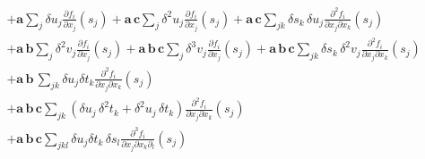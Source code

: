 \documentclass[11pt]{article}
\begin{document}
\begin{align*}
\\
&+ 
\mathbf{a} \sum_{j} \delta u_{j} \frac{ \partial f_{i} }{ \partial x_{j} } \! \left( s_{j} \right)
+ \mathbf{a} \, \mathbf{c} \sum_{j} \delta^{2} u_{j} 
\frac{ \partial f_{i} }{ \partial x_{j} } \! \left( s_{j} \right) 
+ \mathbf{a} \, \mathbf{c} \sum_{jk} \delta s_{k} \, \delta u_{j} 
\frac{ \partial^{2} f_{i} }{ \partial x_{j} \partial x_{k} } \! \left( s_{j} \right)
\\
&+ 
\mathbf{a} \, \mathbf{b} \sum_{j} \delta^{2} v_{j} 
\frac{ \partial f_{i} }{ \partial x_{j} } \! \left( s_{j} \right)
+ \mathbf{a} \, \mathbf{b} \, \mathbf{c} \sum_{j} \delta^{3} v_{j} 
\frac{ \partial f_{i} }{ \partial x_{j} } \! \left( s_{j} \right) 
+ \mathbf{a} \, \mathbf{b} \, \mathbf{c} \sum_{jk} \delta s_{k} \, \delta^{2} v_{j} 
\frac{ \partial^{2} f_{i} }{ \partial x_{j} \partial x_{k} } \! \left( s_{j} \right)
\\
&+ 
\mathbf{a} \, \mathbf{b} \, \sum_{jk} 
\delta u_{j} \delta t_{k} \frac{ \partial^{2} f_{i} }{ \partial x_{j} \partial x_{k} } \! \left( s_{j} \right)
\\
&+ \mathbf{a} \, \mathbf{b} \, \mathbf{c} \sum_{jk}
\left( \delta u_{j} \, \delta^{2} t_{k} + \delta^{2} u_{j} \, \delta t_{k}  \right)
\frac{ \partial^{2} f_{i} }{ \partial x_{j} \partial x_{k} } \! \left( s_{j} \right) 
\\
&+
\mathbf{a} \, \mathbf{b} \, \mathbf{c} \sum_{jkl}
\delta u_{j} \delta t_{k} \, \delta s_{l} 
\frac{ \partial^{3} f_{i} }{ \partial x_{j} \partial x_{k} \partial_{l} } \! \left( s_{j} \right)
\\
%
\end{align*}
\end{document}
